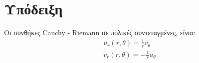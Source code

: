 \documentclass[a4paper,table]{report}
\begin{document}
\section*{Υπόδειξη}

Οι συνθήκες Cauchy - Riemann σε πολικές συντεταγμένες, είναι:
\begin{gather*}
  u_r(r,\theta) = \frac{1}{r} v_{\theta} \\
  v_{r}(r,\theta) = - \frac{1}{r} u_{\theta}
\end{gather*}
\end{document}
